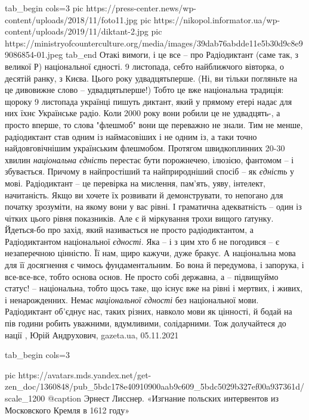 \ifcmt
  tab_begin cols=3
     pic https://press-center.news/wp-content/uploads/2018/11/foto11.jpg
     pic https://nikopol.informator.ua/wp-content/uploads/2019/11/diktant-2.jpg
		 pic https://ministryofcounterculture.org/media/images/39dab76abdde11e5b30d9c8e99086854-01.jpeg
  tab_end
\fi
Отакі вимоги, і це все – про Радіодиктант (саме так, з великої Р) національної
єдності. 9 листопада, себто найближчого вівторка, о десятій ранку, з Києва.
Цього року удвадцятьперше. (Ні, ви тільки погляньте на це дивовижне слово –
удвадцятьперше!) Тобто це вже національна традиція: щороку 9 листопада українці
пишуть диктант, який у прямому етері надає для них їхнє Українське радіо. Коли
2000 року вони робили це не удвадцять-, а просто вперше, то слова "флешмоб"
вони ще переважно не знали. Тим не менше, радіодиктант став одним із
наймасовіших і не одним із, а таки точно найдовговічнішим українським
флешмобом. Протягом швидкоплинних 20-30 хвилин \emph{національна єдність}
перестає бути порожнечею, ілюзією, фантомом – і збувається. Причому в
найпростіший та найприродніший спосіб – як \emph{єдність} у мові.  Радіодиктант
– це перевірка на мислення, пам'ять, уяву, інтелект, начитаність.  Якщо ви
хочете їх розвивати й демонструвати, то непогано для початку зрозуміти, на
якому вони у вас рівні. І граматична адекватність – один із чітких цього рівня
показників.  Але є й міркування трохи вищого ґатунку. Йдеться-бо про захід,
який називається не просто радіодиктантом, а Радіодиктантом національної
\emph{єдності}. Яка – і з цим хто б не погодився – є незаперечною цінністю. Її
нам, щиро кажучи, дуже бракує.  А національна мова для її досягнення є чимось
фундаментальним. Бо вона й передумова, і запорука, і все-все-все, тобто основа
основ. Не просто собі державна, а – підвищуймо статус! – національна, тобто
щось таке, що існує вже на рівні і мертвих, і живих, і ненарожденних. Немає
\emph{національної єдності} без національної мови. Радіодиктант об'єднує нас,
таких різних, навколо мови як цінності, й бодай на пів години робить уважними,
вдумливими, солідарними.  Тож долучайтеся до нації
, 
Юрій Андрухович, gazeta.ua, 05.11.2021

\ifcmt
  tab_begin cols=3

     pic https://avatars.mds.yandex.net/get-zen_doc/1360848/pub_5bdc178e40910900aab9c609_5bdc5029b327ef00a937361d/scale_1200
		 @caption Эрнест Лисснер. «Изгнание польских интервентов из Московского Кремля в 1612 году»

